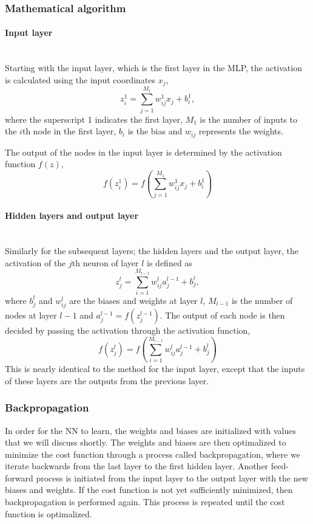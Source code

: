 \documentclass[a4paper, 11pt, twocolumn]{article}
\newcommand{\myparagraph}[1]{\paragraph{#1}\mbox{}\\}
\begin{document}
\subsubsection*{Mathematical algorithm} \myparagraph{Input layer}
Starting with the input layer, which is the first layer in the MLP, the
activation is calculated using the input coordinates $x_j$,
\begin{equation}
z_i^1 = \sum^{M_1}_{j=1}w_{ij}^1x_j + b_i^1,
\end{equation}
where the superscript 1 indicates the first layer, $M_1$ is the number of inputs
to the $i$th node in the first layer, $b_i$ is the bias and $w_{ij}$ represents
the weights.

The output of the nodes in the input layer is determined by the activation
function $f(z)$,
\begin{equation}
f(z_i^1) = f \left( \sum^{M_1}_{j=1}w_{ij}^1x_j + b_i^1 \right)
\end{equation}
\myparagraph{Hidden layers and output layer}
Similarly for the subsequent layers; the hidden layers and the output layer, the
activation of the $j$th neuron of layer $l$ is defined as
\begin{equation}
z_j^l = \sum_{i=1}^{M_{l-1}} w_{ij}^la_j^{l-1} + b_j^l,
\end{equation}
where $b_j^l$ and $w_{ij}^l$ are the biases and weights at layer $l$, ${M_{l-1}}$
is the number of nodes at layer $l-1$ and $a_j^{l-1}=f(z_j^{l-1}) $.
The output of each node is then decided by passing the activation through the
activation function,
\begin{equation}
 f(z_j^l) =f \left(     \sum_{i=1}^{M_{l-1}} w_{ij}^la_j^{l-1} + b_j^l \right)
\end{equation}
This is nearly identical to the method for the input layer, except that the
inputs of these layers are the outputs from the previous layer.

\subsubsection{Backpropagation} \label{subsub:backpropagation}
In order for the NN to learn, the weights and biases are initialized with values
that we will discuss shortly. The weights and biases are then optimalized to
minimize the cost function through a process called backpropagation, where we
iterate backwards from the last layer to the first hidden layer. Another feed-forward process is initiated  from the input layer to the output layer with the new
biases and weights. If the cost function is not yet sufficiently minimized, then
backpropagation is performed again. This process is repeated until the cost
function is optimalized.
\end{document}

